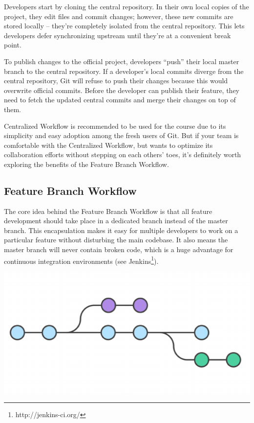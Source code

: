 \documentclass{article}
\begin{document}
Developers start by cloning the central repository. In their own local
copies of the project, they edit files and commit changes; however,
these new commits are stored locally -- they're 
completely isolated from the central repository. This lets developers
defer synchronizing upstream until they're at a convenient break
point.

To publish changes to the official project, developers ``push'' their
local master branch to the central repository. 
If a developer's local commits diverge from the central repository,
Git will refuse to push their changes because this would overwrite
official commits. Before the developer can publish their feature, they
need to fetch the updated central commits and merge their changes on
top of them.

Centralized Workflow is recommended to be used for the course due to 
its simplicity and easy adoption among the fresh users of Git.
But if your team is comfortable with the Centralized Workflow, but wants to
optimize its collaboration efforts without stepping on each others'
toes, it's definitely worth exploring the benefits of the Feature
Branch Workflow.


\subsection{Feature Branch Workflow}

The core idea behind the Feature Branch Workflow is that all feature
development should take place in a dedicated branch instead of the
master branch. This encapsulation makes it easy for multiple
developers to work on a particular feature without disturbing the main
codebase. It also means the master branch will never contain broken
code, which is a huge advantage for continuous integration
environments (see Jenkins\footnote{http://jenkins-ci.org/}).
 
\begin{center}
\includegraphics[scale=0.5]{figures/13.pdf}
\end{center}
\end{document}
